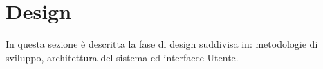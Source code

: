 \section{Design}
In questa sezione è descritta la fase di design suddivisa in: metodologie di sviluppo, architettura del sistema ed interfacce Utente.
